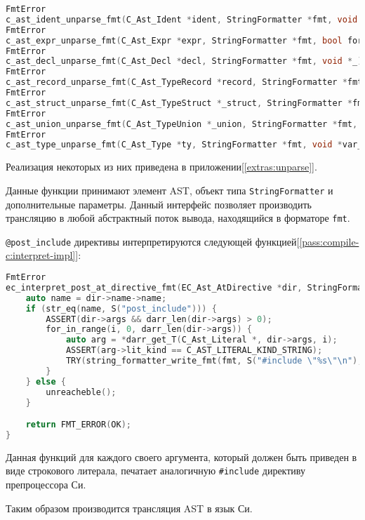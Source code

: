 \begin{lstlisting}[language=c, caption={Заголовки функций трансляции AST в язык Си}, label={pass:compile-c:unparse-headers}]
FmtError
c_ast_ident_unparse_fmt(C_Ast_Ident *ident, StringFormatter *fmt, void *_);
FmtError
c_ast_expr_unparse_fmt(C_Ast_Expr *expr, StringFormatter *fmt, bool force_parens);
FmtError
c_ast_decl_unparse_fmt(C_Ast_Decl *decl, StringFormatter *fmt, void *_);
FmtError
c_ast_record_unparse_fmt(C_Ast_TypeRecord *record, StringFormatter *fmt, void *_);
FmtError
c_ast_struct_unparse_fmt(C_Ast_TypeStruct *_struct, StringFormatter *fmt, void *_);
FmtError
c_ast_union_unparse_fmt(C_Ast_TypeUnion *_union, StringFormatter *fmt, void *_);
FmtError
c_ast_type_unparse_fmt(C_Ast_Type *ty, StringFormatter *fmt, void *var_name, bool discard_leaf);
\end{lstlisting}

Реализация некоторых из них приведена в приложении[\ref{extras:unparse}].

Данные функции принимают элемент AST, объект типа \verb|StringFormatter| и дополнительные параметры.
Данный интерфейс позволяет производить трансляцию в любой абстрактный поток вывода, находящийся в форматоре \verb|fmt|.



\verb|@post_include| директивы интерпретируются следующей функцией[\ref{pass:compile-c:interpret-impl}]:

\begin{lstlisting}[language=c, caption={Функция трансляции директив}, label={pass:compile-c:interpret-impl}]
FmtError
ec_interpret_post_at_directive_fmt(EC_Ast_AtDirective *dir, StringFormatter *fmt, void *) {
    auto name = dir->name->name;
    if (str_eq(name, S("post_include"))) {
        ASSERT(dir->args && darr_len(dir->args) > 0);
        for_in_range(i, 0, darr_len(dir->args)) {
            auto arg = *darr_get_T(C_Ast_Literal *, dir->args, i);
            ASSERT(arg->lit_kind == C_AST_LITERAL_KIND_STRING);
            TRY(string_formatter_write_fmt(fmt, S("#include \"%s\"\n"), arg->l_str.t_str_lit->str));
        }
    } else {
        unreacheble();
    }

    return FMT_ERROR(OK);
}
\end{lstlisting}

Данная функций для каждого своего аргумента, который должен быть приведен в виде строкового литерала, печатает аналогичную \verb|#include| директиву препроцессора Си.

Таким образом производится трансляция AST в язык Си.

